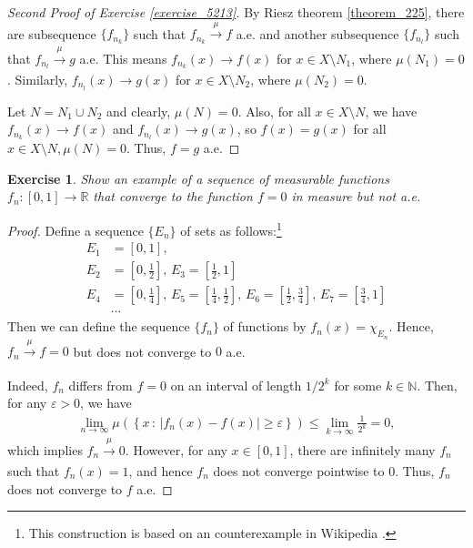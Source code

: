 \documentclass[11pt]{book}
\newtheorem{exercise}{Exercise}[section]
\theoremstyle{definition}
\numberwithin{equation}{chapter}
\begin{document}
\begin{proof}[Second Proof of Exercise \ref{exercise_5213}]
By Riesz theorem \ref{theorem_225}, there are subsequence $\{f_{n_k}\}$ such that $f_{n_k} \xrightarrow[]{\mu} f$ a.e. and another subsequence $\{f_{n_l}\}$ such that $f_{n_l} \xrightarrow[]{\mu} g$ a.e. This means $f_{n_k}(x) \to f(x)$ for $x \in X \setminus N_1$, where $\mu(N_1) = 0$. Similarly, $f_{n_l}(x) \to g(x)$ for $x \in X \setminus N_2$, where $\mu(N_2) = 0$.

Let $N = N_1 \cup N_2$ and clearly, $\mu(N) = 0$. Also, for all $x \in X \setminus N$, we have $f_{n_k}(x) \to f(x)$ and $f_{n_l}(x) \to g(x)$, so $f(x) = g(x)$ for all $x \in X \setminus N, \mu(N) = 0$. Thus, $f = g$ a.e.
\end{proof}

\medskip

\begin{exercise}
Show an example of a sequence of measurable functions $f_n:[0,1]\to\mathbb{R}$ that converge to the function $f=0$ in measure but not a.e.
\end{exercise}
\begin{proof}
Define a sequence $\{E_n\}$ of sets as follows:\footnote{This construction is based on an counterexample in Wikipedia \cite{34}.}
\begin{align*}
    E_1 & = \left[0,1\right], \\ 
    E_2 & = \left[0,\frac{1}{2}\right], \, E_3 = \left[\frac{1}{2},1\right] \\
    E_4 & = \left[0,\frac{1}{4}\right], \, E_5 = \left[\frac{1}{4},\frac{1}{2}\right],\, E_6 = \left[\frac{1}{2},\frac{3}{4}\right], \, E_7 = \left[\frac{3}{4},1\right] \\
    & \cdots
\end{align*}
Then we can define the sequence $\{f_n\}$ of functions by $f_n(x) = \chi_{E_n}$. Hence, $f_n \xrightarrow[]{\mu} f = 0$ but does not converge to $0$ a.e. 

Indeed, $f_n$ differs from $f = 0$ on an interval of length $1/2^k$ for some  $k \in \mathbb{N}$. Then, for any $\varepsilon > 0$, we have
\begin{align*}
    \lim_{n\to\infty} \mu\left(\left\{x \,:\, \left|f_n(x) - f(x)\right| \geq \varepsilon \right\}\right) \leq \lim_{k\to\infty} \frac{1}{2^k} = 0,
\end{align*}
which implies $f_n \xrightarrow[]{\mu} 0$. However, for any $x \in [0,1]$, there are infinitely many $f_n$ such that $f_n(x) = 1$, and hence $f_n$ does not converge pointwise to $0$. Thus, $f_n$ does not converge to $f$ a.e.
\end{proof}
\end{document}
